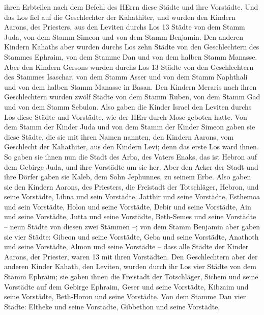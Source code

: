 ihren Erbteilen nach dem Befehl des HErrn diese Städte und ihre
Vorstädte.  Und das Los fiel auf die Geschlechter der
Kahathiter, und wurden den Kindern Aarons, des Priesters, aus den
Leviten durchs Los 13 Städte von dem Stamm Juda, von dem Stamm Simeon
und von dem Stamm Benjamin.  Den anderen Kindern Kahaths
aber wurden durchs Los zehn Städte von den Geschlechtern des Stammes
Ephraim, von dem Stamme Dan und von dem halben Stamm Manasse.
 Aber den Kindern Gersons wurden durchs Los 13 Städte von
den Geschlechtern des Stammes Isaschar, von dem Stamm Asser und von dem
Stamm Naphthali und von dem halben Stamm Manasse in Basan. 
Den Kindern Meraris nach ihren Geschlechtern wurden zwölf Städte von dem
Stamm Ruben, von dem Stamm Gad und von dem Stamm Sebulon. 
Also gaben die Kinder Israel den Leviten durchs Los diese Städte und
Vorstädte, wie der HErr durch Mose geboten hatte.  Von dem
Stamm der Kinder Juda und von dem Stamm der Kinder Simeon gaben sie
diese Städte, die sie mit ihren Namen nannten,  den Kindern
Aarons, vom Geschlecht der Kahathiter, aus den Kindern Levi; denn das
erste Los ward ihnen.  So gaben sie ihnen nun die Stadt des
Arba, des Vaters Enaks, das ist Hebron auf dem Gebirge Juda, und ihre
Vorstädte um sie her.  Aber den Acker der Stadt und ihre
Dörfer gaben sie Kaleb, dem Sohn Jephunnes, zu seinem Erbe.
 Also gaben sie den Kindern Aarons, des Priesters, die
Freistadt der Totschläger, Hebron, und seine Vorstädte, Libna und sein
Vorstädte,  Jatthir und seine Vorstädte, Esthemoa und sein
Vorstädte,  Holon und seine Vorstädte, Debir und seine
Vorstädte,  Ain und seine Vorstädte, Jutta und seine
Vorstädte, Beth-Semes und seine Vorstädte -- neun Städte von diesen zwei
Stämmen --;  von dem Stamm Benjamin aber gaben sie vier
Städte: Gibeon und seine Vorstädte, Geba und seine Vorstädte,
 Anathoth und seine Vorstädte, Almon und seine Vorstädte --
 dass alle Städte der Kinder Aarons, der Priester, waren 13
mit ihren Vorstädten.  Den Geschlechtern aber der anderen
Kinder Kahath, den Leviten, wurden durch ihr Los vier Städte von dem
Stamm Ephraim;  sie gaben ihnen die Freistadt der
Totschläger, Sichem und seine Vorstädte auf dem Gebirge Ephraim, Geser
und seine Vorstädte,  Kibzaim und seine Vorstädte,
Beth-Horon und seine Vorstädte.  Von dem Stamme Dan vier
Städte: Eltheke und seine Vorstädte, Gibbethon und seine Vorstädte,
